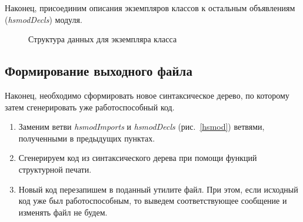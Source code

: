 Наконец, присоединим описания экземпляров классов к остальным объявлениям (\textit{hsmodDecls}) модуля.

\begin{figure}[h]
\caption{Структура данных для экземпляра класса}\label{instance}
\end{figure}

\subsection{Формирование выходного файла}
Наконец, необходимо сформировать новое синтаксическое дерево, по которому затем сгенерировать уже работоспособный код.
\begin{enumerate}[1.]
    \item Заменим ветви \textit{hsmodImports} и \textit{hsmodDecls} (рис.~\ref{hsmod}) ветвями, полученными в предыдущих пунктах.
    \item Сгенерируем код из синтаксического дерева при помощи функций структурной печати.
    \item Новый код перезапишем в поданный утилите файл. При этом, если исходный код уже был работоспособным, то выведем соответствующее сообщение и изменять файл не будем.
\end{enumerate}

